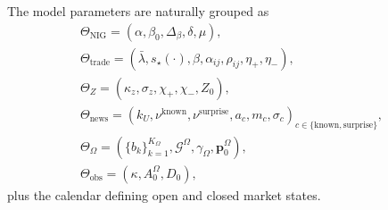 \documentclass[11pt]{article}
\begin{document}
    The model parameters are naturally grouped as
    \begin{gather*}
        \Theta_{\mathrm{NIG}}
        =
        (\alpha,\beta_0,\Delta_\beta,\delta,\mu),\\
        \Theta_{\mathrm{trade}}
        =
        (\bar\lambda,s_\star(\cdot),\beta,\alpha_{ij},\rho_{ij},
        \eta_+,\eta_-),\\
        \Theta_Z
        =
        (\kappa_z,\sigma_z,\chi_+,\chi_-,Z_0),\\
        \Theta_{\mathrm{news}}
        =
        \left(k_U,\nu^{\mathrm{known}},\nu^{\mathrm{surprise}},
        a_c,m_c,\sigma_c\right)_{c\in\{\mathrm{known},\mathrm{surprise}\}},\\
        \Theta_\Omega
        =
        (\{b_k\}_{k=1}^{K_\Omega},\mathcal G^\Omega,\gamma_\Omega,\mathbf p^\Omega_0),\\
        \Theta_{\mathrm{obs}}
        =
        (\kappa,A_0^\Omega,D_0),
    \end{gather*}
    plus the calendar defining open and closed market states.
\end{document}
